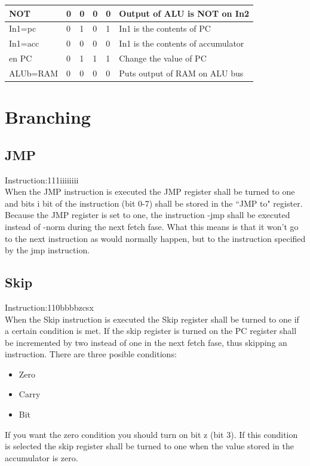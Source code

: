 \documentclass{article}
\begin{document}
\begin{center}
\begin{tabular}{l l l l l p{6cm} }
		NOT	        & 0    & 0     & 0    & 0     &Output of ALU is NOT on In2	 \\ \hline
		In1=pc	        & 0    & 1     & 0    & 1     &In1 is the contents of PC	 \\ \hline
		In1=acc	        & 0    & 0     & 0    & 0     &In1 is the contents of accumulator	 \\ \hline
		en PC	        & 0    & 1     & 1    & 1     &Change the value of PC	 \\ \hline
		ALUb=RAM	& 0    & 0     & 0    & 0     &Puts output of RAM on ALU bus	 \\ \hline
		\hline
	\end{tabular}
\end{center}

\section{Branching\label{Branch}}
\subsection{JMP}
Instruction:111iiiiiiii
~\\
When the JMP instruction is executed the JMP register shall be turned to one and bits i bit of the instruction (bit 0-7) shall be stored in the ``JMP to" register. Because the JMP register is set to one, the instruction -jmp shall be executed instead of -norm during the next fetch fase. What this means is that it won't go to the next instruction as would normally happen, but to the instruction specified by the jmp instruction.
\subsection{Skip\label{SkipCarry}}
Instruction:110bbbbzcsx
~\\
When the Skip instruction is executed the Skip register shall be turned to one if a certain condition is met. If the skip register is turned on the PC register shall be incremented by two instead of one in the next fetch fase, thus skipping an instruction. There are three posible conditions:
\begin{itemize}
	\item{Zero}
	\item{Carry}
	\item{Bit}
\end{itemize}
If you want the zero condition you should turn on bit z (bit 3). If this condition is selected the skip register shall be turned to one when the value stored in the accumulator is zero.
\end{document}
